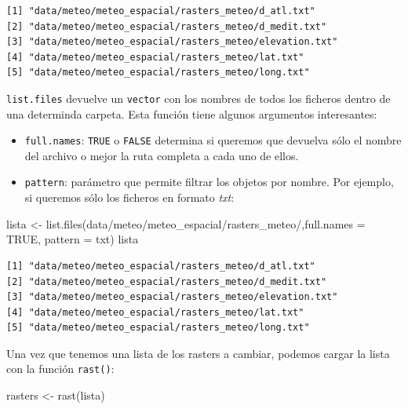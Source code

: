 \documentclass[
  letterpaper,
  DIV=11,
  numbers=noendperiod]{scrreprt}
\newenvironment{Shaded}{\begin{snugshade}}{\end{snugshade}}
\newcommand{\AttributeTok}[1]{\textcolor[rgb]{0.40,0.45,0.13}{#1}}
\newcommand{\ConstantTok}[1]{\textcolor[rgb]{0.56,0.35,0.01}{#1}}
\newcommand{\FunctionTok}[1]{\textcolor[rgb]{0.28,0.35,0.67}{#1}}
\newcommand{\NormalTok}[1]{\textcolor[rgb]{0.00,0.23,0.31}{#1}}
\newcommand{\OtherTok}[1]{\textcolor[rgb]{0.00,0.23,0.31}{#1}}
\newcommand{\StringTok}[1]{\textcolor[rgb]{0.13,0.47,0.30}{#1}}
\providecommand{\tightlist}{%
  \setlength{\itemsep}{0pt}\setlength{\parskip}{0pt}}\usepackage{longtable,booktabs,array}
\begin{document}
\begin{verbatim}
[1] "data/meteo/meteo_espacial/rasters_meteo/d_atl.txt"    
[2] "data/meteo/meteo_espacial/rasters_meteo/d_medit.txt"  
[3] "data/meteo/meteo_espacial/rasters_meteo/elevation.txt"
[4] "data/meteo/meteo_espacial/rasters_meteo/lat.txt"      
[5] "data/meteo/meteo_espacial/rasters_meteo/long.txt"     
\end{verbatim}

\texttt{list.files} devuelve un \texttt{vector} con los nombres de todos
los ficheros dentro de una determinda carpeta. Esta función tiene
algunos argumentos interesantes:

\begin{itemize}
\tightlist
\item
  \texttt{full.names}: \texttt{TRUE} o \texttt{FALSE} determina si
  queremos que devuelva sólo el nombre del archivo o mejor la ruta
  completa a cada uno de ellos.
\item
  \texttt{pattern}: parámetro que permite filtrar los objetos por
  nombre. Por ejemplo, si queremos sólo los ficheros en formato
  \emph{txt}:
\end{itemize}

\begin{Shaded}
\begin{Highlighting}[]
\NormalTok{lista }\OtherTok{\textless{}{-}} \FunctionTok{list.files}\NormalTok{(}\StringTok{\textquotesingle{}data/meteo/meteo\_espacial/rasters\_meteo/\textquotesingle{}}\NormalTok{,}\AttributeTok{full.names =} \ConstantTok{TRUE}\NormalTok{, }\AttributeTok{pattern =} \StringTok{\textquotesingle{}txt\textquotesingle{}}\NormalTok{)}
\NormalTok{lista}
\end{Highlighting}
\end{Shaded}

\begin{verbatim}
[1] "data/meteo/meteo_espacial/rasters_meteo/d_atl.txt"    
[2] "data/meteo/meteo_espacial/rasters_meteo/d_medit.txt"  
[3] "data/meteo/meteo_espacial/rasters_meteo/elevation.txt"
[4] "data/meteo/meteo_espacial/rasters_meteo/lat.txt"      
[5] "data/meteo/meteo_espacial/rasters_meteo/long.txt"     
\end{verbatim}

Una vez que tenemos una lista de los rasters a cambiar, podemos cargar
la lista con la función \texttt{rast()}:

\begin{Shaded}
\begin{Highlighting}[]
\NormalTok{rasters }\OtherTok{\textless{}{-}} \FunctionTok{rast}\NormalTok{(lista)}
\end{Highlighting}
\end{Shaded}
\end{document}
